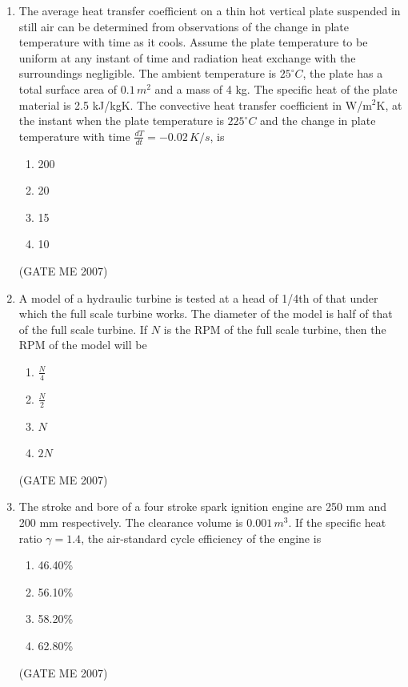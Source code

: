 \documentclass[journal]{IEEEtran}
\begin{document}
\begin{enumerate}
\item The average heat transfer coefficient on a thin hot vertical plate suspended in still air can be determined from observations of the change in plate temperature with time as it cools. Assume the plate temperature to be uniform at any instant of time and radiation heat exchange with the surroundings negligible. The ambient temperature is \( 25^\circ C \), the plate has a total surface area of \( 0.1 \, m^2 \) and a mass of 4 kg. The specific heat of the plate material is 2.5 kJ/kgK. The convective heat transfer coefficient in W/m\(^2\)K, at the instant when the plate temperature is \( 225^\circ C \) and the change in plate temperature with time \( \frac{dT}{dt} = -0.02 \, K/s \), is
\begin{multicols}{4}
\begin{enumerate}
\item 200
\item 20
\item 15
\item 10
\end{enumerate}
\end{multicols}
\hfill (GATE ME 2007)

\item A model of a hydraulic turbine is tested at a head of 1/4th of that under which the full scale turbine works. The diameter of the model is half of that of the full scale turbine. If \( N \) is the RPM of the full scale turbine, then the RPM of the model will be
\begin{multicols}{4}
\begin{enumerate}
\item \( \frac{N}{4} \)
\item \( \frac{N}{2} \)
\item \( N \)
\item \( 2N \)
\end{enumerate}
\end{multicols}
\hfill (GATE ME 2007)

\item The stroke and bore of a four stroke spark ignition engine are 250 mm and 200 mm respectively. The clearance volume is \( 0.001 \, m^3 \). If the specific heat ratio \( \gamma = 1.4 \), the air-standard cycle efficiency of the engine is
\begin{multicols}{4}
\begin{enumerate}
\item 46.40\%
\item 56.10\%
\item 58.20\%
\item 62.80\%
\end{enumerate}
\end{multicols}
\hfill (GATE ME 2007)


\end{enumerate}
\end{document}
